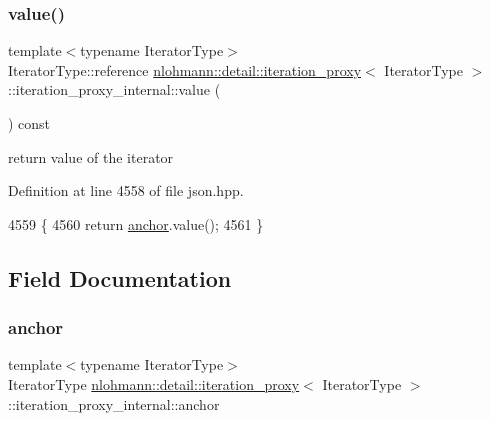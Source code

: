 \subsubsection{\texorpdfstring{value()}{value()}}
{\footnotesize\ttfamily template$<$typename Iterator\+Type$>$ \\
Iterator\+Type\+::reference \hyperlink{classnlohmann_1_1detail_1_1iteration__proxy}{nlohmann\+::detail\+::iteration\+\_\+proxy}$<$ Iterator\+Type $>$\+::iteration\+\_\+proxy\+\_\+internal\+::value (\begin{DoxyParamCaption}{ }\end{DoxyParamCaption}) const\hspace{0.3cm}{\ttfamily [inline]}}



return value of the iterator 



Definition at line 4558 of file json.\+hpp.


\begin{DoxyCode}
4559         \{
4560             \textcolor{keywordflow}{return} \hyperlink{classnlohmann_1_1detail_1_1iteration__proxy_1_1iteration__proxy__internal_a994faf46a2f04ecb85d17b74641611a6}{anchor}.value();
4561         \}
\end{DoxyCode}


\subsection{Field Documentation}
\mbox{\label{classnlohmann_1_1detail_1_1iteration__proxy_1_1iteration__proxy__internal_a994faf46a2f04ecb85d17b74641611a6}} 
\subsubsection{\texorpdfstring{anchor}{anchor}}
{\footnotesize\ttfamily template$<$typename Iterator\+Type$>$ \\
Iterator\+Type \hyperlink{classnlohmann_1_1detail_1_1iteration__proxy}{nlohmann\+::detail\+::iteration\+\_\+proxy}$<$ Iterator\+Type $>$\+::iteration\+\_\+proxy\+\_\+internal\+::anchor\hspace{0.3cm}{\ttfamily [private]}}



